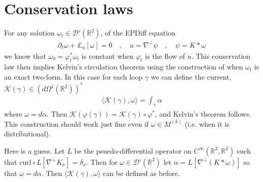 \documentclass[12pt]{amsart}
\newcommand{\R}{\ensuremath{\mathbb{R}}}
\begin{document}
\section{Conservation laws}
\label{sec:conservation}
For any solution $\omega_t \in \mathcal{D}'(\R^2)$, of the EPDiff equation
\begin{align*}
  \partial_t \omega + \pounds_u [\omega] = 0 \quad,\quad u = \nabla^\perp \psi \quad,\quad \psi = K*\omega
\end{align*}
we know that $\omega_0 = \varphi_t^* \omega_t$ is constant
when $\varphi_t$ is the flow of $u$.
This conservation law then implies Kelvin's circulation theorem
using the construction of \cite{HolmMarsdenRatiu1998}
when $\omega_t$ is an exact two-form.
In this case for each loop $\gamma$
we can define the current, $\mathcal{K}(\gamma) \in  \left( d \Omega^1 (\R^2) \right)^*$
\begin{align*}
  \langle \mathcal{K}(\gamma) , \omega \rangle = \int_{\gamma} \alpha
\end{align*}
where $\omega = d\alpha$.
Then $\mathcal{K}( \varphi (\gamma) ) = \mathcal{K}(\gamma) \circ \varphi^*$, and Kelvin's theorem follows.
This construction should work just fine even if $\omega \in M^{(k)}$ (i.e. when it is distributional).

Here is a guess.
Let $L$ be the psuedo-differential operator on $C^\infty(\R^2,\R^2)$
such that $\mathrm{curl} \circ L[ \nabla^\perp K_x] = \delta_x$.
Then for $\omega \in \mathcal{D}'(\R^2)$ let $\alpha = L[\nabla^\perp (K*\omega)]$ so that $\omega = d\alpha$.  Then $\langle \mathcal{K}(\gamma) , \omega \rangle$ can be defined as before.


\end{document}
